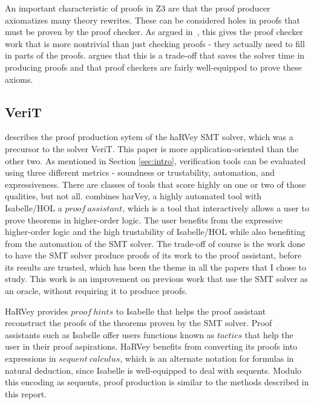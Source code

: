\documentclass{article}
\begin{document}
An important characteristic of proofs in Z3 are that the
proof producer axiomatizes many theory rewrites. These 
can be considered holes in proofs that must be proven 
by the proof checker. As argued 
in~\cite{DBLP:conf/fmcad/KatzBTRH16}, this gives the proof 
checker work that is more nontrivial than just checking 
proofs - they actually need to fill in parts of the proofs. 
\cite{DBLP:conf/lpar/MouraB08} argues that this is a 
trade-off that saves the solver time in producing proofs 
and that proof checkers are fairly well-equipped to 
prove these axioms.


\subsection{VeriT}
\label{sec:verit}
\cite{DBLP:conf/tacas/FontaineMMNT06} describes the proof
production sytem of the haRVey SMT solver, which was a
precursor to the solver VeriT. This paper is more 
application-oriented than the other two. As mentioned in 
Section \ref{sec:intro}, verification tools can be 
evaluated using three different metrics - soundness or 
trustability, automation, and expressiveness. There are 
classes of tools that score highly on one or two of those 
qualities, but not all. 
\cite{DBLP:conf/tacas/FontaineMMNT06} combines harVey, 
a highly automated tool with Isabelle/HOL a $proof\ assistant$, 
which is a tool that interactively allows a user 
to prove theorems in higher-order logic. The user
benefits from the expressive higher-order logic and 
the high trustability of Isabelle/HOL while also 
benefiting from the automation of the SMT solver.
The trade-off of course is the work done to have 
the SMT solver produce proofs of its work to the 
proof assistant, before its results are trusted, which has 
been the theme in all the papers that I chose to study.
This work is an improvement on previous work that use 
the SMT solver as an oracle, without requiring it to 
produce proofs.

HaRVey provides $proof\ hints$ to Isabelle that 
helps the proof assistant reconstruct the proofs 
of the theorems proven by the SMT solver. Proof 
assistants such as Isabelle offer users functions 
known as $tactics$ that help the user in their 
proof aspirations. HaRVey benefits from converting 
its proofs into expressions in $sequent\ calculus$, 
which is an alternate notation for formulas in 
natural deduction, since Isabelle is well-equipped to
deal with sequents. Modulo this encoding as sequents, 
proof production is similar to the methods described 
in this report. 
\end{document}
